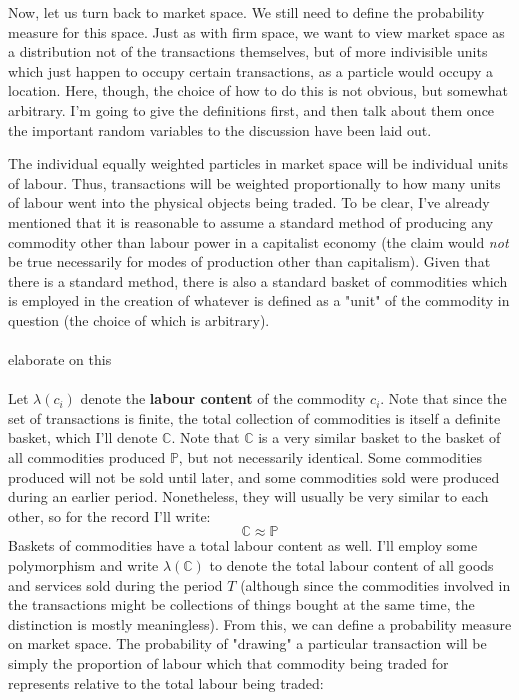 Now, let us turn back to market space. We still need to define the probability measure for this space. Just as with firm space, we want to view market space as a distribution not of the transactions themselves, but of more indivisible units which just happen to occupy certain transactions, as a particle would occupy a location. Here, though, the choice of how to do this is not obvious, but somewhat arbitrary. I'm going to give the definitions first, and then talk about them once the important random variables to the discussion have been laid out. \par 
The individual equally weighted particles in market space will be individual units of labour. Thus, transactions will be weighted proportionally to how many units of labour went into the physical objects being traded. To be clear, I've already mentioned that it is reasonable to assume a standard method of producing any commodity other than labour power in a capitalist economy (the claim would \textit{not} be true necessarily for modes of production other than capitalism). Given that there is a standard method, there is also a standard basket of commodities which is employed in the creation of whatever is defined as a "unit" of the commodity in question (the choice of which is arbitrary). 
\\
\\
elaborate on this
\\
\\
Let $\lambda(c_i)$ denote the \textbf{labour content} of the commodity $c_i$. Note that since the set of transactions is finite, the total collection of commodities is itself a definite basket, which I'll denote $\mathbb{C}$. Note that $\mathbb{C}$ is a very similar basket to the basket of all commodities produced $\mathbb{P}$, but not necessarily identical. Some commodities produced will not be sold until later, and some commodities sold were produced during an earlier period. Nonetheless, they will usually be very similar to each other, so for the record I'll write:
\[ \mathbb{C} \approx \mathbb{P} \]
Baskets of commodities have a total labour content as well. I'll employ some polymorphism and write $\lambda(\mathbb{C})$ to denote the total labour content of all goods and services sold during the period $T$ (although since the commodities involved in the transactions might be collections of things bought at the same time, the distinction is mostly meaningless). From this, we can define a probability measure on market space. The probability of "drawing" a particular transaction will be simply the proportion of labour which that commodity being traded for represents relative to the total labour being traded:
